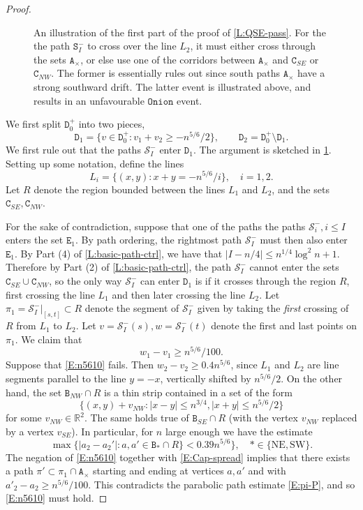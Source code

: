 \documentclass[10pt,a4paper]{amsart}
\newcommand{\R}{\mathbb{R}}
\newcommand{\cS}{\mathcal{S}}
\renewcommand{\tt}[1]{{\mathtt{#1}}}
\begin{document}
\begin{proof}
\begin{figure}
            \caption{An illustration of the first part of the proof of \cref{L:QSE-pass}. For the the path $\tt{S}_I^-$ to cross over the line $L_2$, it must either cross through the sets $\tt{A}_\times$, or else use one of the corridors between $\tt{A}_\times$ and $\tt{C}_{SE}$ or $\tt{C}_{NW}$. The former is essentially rules out since south paths $\tt{A}_\times$  have a strong southward drift. The latter event is illustrated above, and results in an unfavourable $\tt{Onion}$ event.}
            \label{fig:lemma541}
        \end{figure}
        We first split $\tt{D}^+_0$ into two pieces,
		$$
		\tt{D}_1 = \{v \in \tt{D}^+_0 : v_1 + v_2 \ge - n^{5/6}/2\}, \qquad \tt{D}_2 = \tt{D}^+_0 \setminus \tt{D}_1.
		$$ 
		We first rule out that the paths $\cS_I^-$ enter $\tt{D}_1$. The argument is sketched in \cref{fig:lemma541}. Setting up some notation, define the lines
		$$
		L_i = \{(x, y) : x + y = - n^{5/6}/i \}, \quad i = 1, 2.
		$$
		Let $R$ denote the region bounded between the lines $L_1$ and $L_2$, and the sets $\tt{C}_{SE}, \tt{C}_{NW}$.
		
		For the sake of contradiction, suppose that one of the paths the paths $\cS_i^-, i \le I$ enters the set $\tt{E}_1$. By path ordering, the rightmost path $\cS_I^-$ must then also enter $\tt{E}_1$.	By Part (4) of \cref{L:basic-path-ctrl}, we have that $|I - n/4| \le n^{1/4} \log^2 n + 1$. Therefore by Part (2) of \cref{L:basic-path-ctrl}, the path $\cS_I^-$ cannot enter the sets $\tt{C}_{SE} \cup \tt{C}_{NW}$,	so the only way $\cS_I^-$ can enter $\tt{D}_1$ is if it crosses through the region $R$, first crossing the line $L_1$ and then later crossing the line $L_2$. Let $\pi_1 = \cS_I^-|_{[s, t]} \subset R$ denote the segment of $\cS_I^-$ given by taking the \textit{first} crossing of $R$ from $L_1$ to $L_2$. Let $v = \cS_I^-(s), w = \cS_I^-(t)$ denote the first and last points on $\pi_1$. We claim that
		\begin{equation}
			\label{E:n5610}
			w_1 - v_1 \ge n^{5/6}/100.
		\end{equation}
		Suppose that \eqref{E:n5610} fails. Then $w_2 - v_2 \ge 0.4 n^{5/6}$, since $L_1$ and $L_2$ are line segments parallel to the line $y = - x$, vertically shifted by $n^{5/6}/2$. On the other hand, the set $\tt{B}_{NW} \cap R$ is a thin strip contained in a set of the form
		$$
		\{(x, y) + v_{NW} : |x - y| \le n^{3/4}, |x+y| \le n^{5/6}/2\}
		$$
		for some $v_{NW} \in \R^2$. The same holds true of $\tt{B}_{SE} \cap R$ (with the vertex $v_{NW}$ replaced by a vertex $v_{SE}$). In particular, for $n$ large enough we have the estimate
		\begin{equation}
			\label{E:Cap-spread}
			\max \{|a_2 - a_2'| : a, a' \in \tt{B}_*\cap R \} < 0.39 n^{5/6}\}, \quad  * \in \{\text{NE}, \text{SW}\}.
		\end{equation}
		The negation of \eqref{E:n5610} together with \eqref{E:Cap-spread} implies that there exists a path $\pi' \subset \pi_1 \cap \tt{A}_\times$ starting and ending at vertices $a, a'$ and with $a'_2 - a_2 \ge n^{5/6}/100$. This contradicts the parabolic path estimate \eqref{E:pi-P}, and so \eqref{E:n5610} must hold. 


\end{proof}
\end{document}

